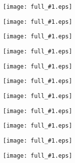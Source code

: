 \documentclass[landscape,a4paper]{article}
\newcommand{\image}[1]{
\begin{figure}%
\texttt{[image: full\_\#1.eps]}
\end{figure}%
}
\begin{document}
\image{000_title}
\image{010_he3}
\image{015_ferro}
\image{030_modes}
\image{040_spinwaves}
\image{050_exp}
\image{070_suhl}
\image{071_suhl}
\image{072_suhl}
\image{080_vort}
\image{100_concl}
\end{document}
